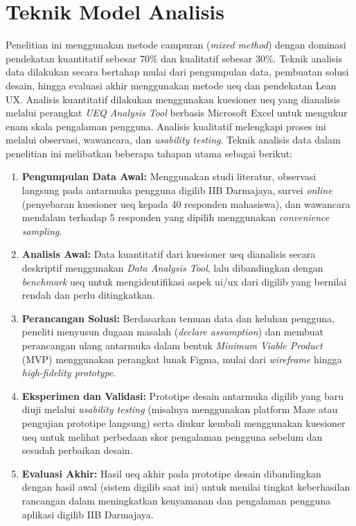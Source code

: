 \section{Teknik Model Analisis}
Penelitian ini menggunakan metode campuran (\textit{mixed method}) dengan dominasi pendekatan kuantitatif sebesar 70\% dan kualitatif sebesar 30\%. Teknik analisis data dilakukan secara bertahap mulai dari pengumpulan data, pembuatan solusi desain, hingga evaluasi akhir menggunakan metode \gls{ueq} dan pendekatan Lean UX. Analisis kuantitatif dilakukan menggunakan kuesioner \gls{ueq} yang dianalisis melalui perangkat \textit{UEQ Analysis Tool} berbasis Microsoft Excel untuk mengukur enam skala pengalaman pengguna. Analisis kualitatif melengkapi proses ini melalui observasi, wawancara, dan \textit{usability testing}. Teknik analisis data dalam penelitian ini melibatkan beberapa tahapan utama sebagai berikut:

\begin{enumerate}
    \item \textbf{Pengumpulan Data Awal:}
    Menggunakan studi literatur, observasi langsung pada antarmuka pengguna \gls{digilib} IIB Darmajaya, survei \textit{online} (penyebaran kuesioner \gls{ueq} kepada 40 responden mahasiswa), dan wawancara mendalam terhadap 5 responden yang dipilih menggunakan \textit{convenience sampling}.
    
    \item \textbf{Analisis Awal:}
    Data kuantitatif dari kuesioner \gls{ueq} dianalisis secara deskriptif menggunakan \textit{Data Analysis Tool}, lalu dibandingkan dengan \textit{benchmark} \gls{ueq} untuk mengidentifikasi aspek \gls{ui}/\gls{ux} dari \gls{digilib} yang bernilai rendah dan perlu ditingkatkan.
    
    \item \textbf{Perancangan Solusi:}
    Berdasarkan temuan data dan keluhan pengguna, peneliti menyusun dugaan masalah (\textit{declare assumption}) dan membuat perancangan ulang antarmuka dalam bentuk \textit{Minimum Viable Product} (MVP) menggunakan perangkat lunak Figma, mulai dari \textit{wireframe} hingga \textit{high-fidelity prototype}.
    
    \item \textbf{Eksperimen dan Validasi:}
    Prototipe desain antarmuka \gls{digilib} yang baru diuji melalui \textit{usability testing} (misalnya menggunakan platform Maze atau pengujian prototipe langsung) serta diukur kembali menggunakan kuesioner \gls{ueq} untuk melihat perbedaan skor pengalaman pengguna sebelum dan sesudah perbaikan desain.
    
    \item \textbf{Evaluasi Akhir:}
    Hasil \gls{ueq} akhir pada prototipe desain dibandingkan dengan hasil awal (sistem \gls{digilib} saat ini) untuk menilai tingkat keberhasilan rancangan dalam meningkatkan kenyamanan dan pengalaman pengguna aplikasi \gls{digilib} IIB Darmajaya.
\end{enumerate}
